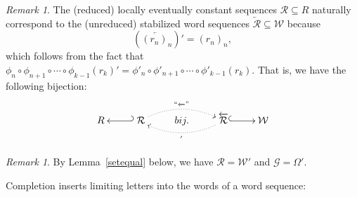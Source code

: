 \documentclass{amsart}
\theoremstyle{definition}
\theoremstyle{remark}
\newtheorem{remark}[theorem]{Remark}
\numberwithin{equation}{section}
\begin{document}
\begin{remark}\label{representation} The (reduced) locally eventually constant sequences $\mathcal R\subseteq R$ naturally correspond to
  the (unreduced) stabilized word sequences  $\overleftarrow{\mathcal R}\subseteq {\mathcal W}$ because \[\left(\overleftarrow{(r_n)_n}\right)'=(r_n)_n,\]  which follows from the fact that $\phi_n\circ \phi_{n+1}\circ \cdots \circ \phi_{k-1}(r_k)'=\phi'_n\circ \phi'_{n+1}\circ \cdots \circ \phi'_{k-1}(r_k)$.
   That is, we have the following bijection:
   \[
\xymatrix{R & \; {\mathcal R} \ar@{_{(}->}[l] \ar@{.>}@/^1pc/[rr]^{``\overleftarrow{\;\;\;}"}  & bij. & \ar@{.>}@/^1pc/[ll]^{'} \overleftarrow{{\mathcal R}}  \ar@{^{(}->}[r] & {\mathcal W}}
\]

\end{remark}

\begin{remark}\label{Rsetequal} By Lemma~\ref{setequal} below, we have ${\mathcal R}={\mathcal W}'$ and ${\mathcal G}=\Omega'$.
\end{remark}

Completion inserts limiting letters into the words of a word sequence:
\end{document}
